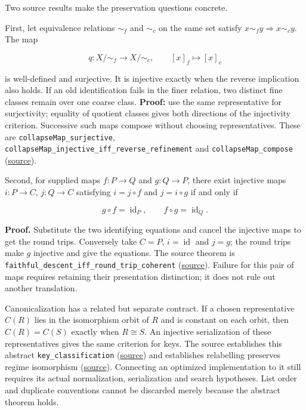 \documentclass[
  11pt,
]{article}
\begin{document}
Two source results make the preservation questions concrete.

First, let equivalence relations \(\sim_f\) and \(\sim_c\) on the same
set satisfy \(x\sim_f y\Rightarrow x\sim_c y\). The map

\[
q:X/{\sim_f}\longrightarrow X/{\sim_c},\qquad [x]_f\longmapsto[x]_c
\]

is well-defined and surjective. It is injective exactly when the reverse
implication also holds. If an old identification fails in the finer
relation, two distinct fine classes remain over one coarse class.
\textbf{Proof:} use the same representative for surjectivity; equality
of quotient classes gives both directions of the injectivity criterion.
Successive such maps compose without choosing representatives. These are
\nolinkurl{collapseMap_surjective},
\nolinkurl{collapseMap_injective_iff_reverse_refinement} and
\nolinkurl{collapseMap_compose}
(\href{lean4/Derivation/QuotientRetention.lean\#L59}{source}).

Second, for supplied maps \(f:P\to Q\) and \(g:Q\to P\), there exist
injective maps \(i:P\to C\), \(j:Q\to C\) satisfying \(i=j\circ f\) and
\(j=i\circ g\) if and only if

\[
g\circ f=\operatorname{id}_P,\qquad f\circ g=\operatorname{id}_Q.
\]

\textbf{Proof.} Substitute the two identifying equations and cancel the
injective maps to get the round trips. Conversely take \(C=P\),
\(i=\operatorname{id}\) and \(j=g\); the round trips make \(g\)
injective and give the equations. The source theorem is
\nolinkurl{faithful_descent_iff_round_trip_coherent}
(\href{lean4/Derivation/PresentationDescent.lean\#L129}{source}).
Failure for this pair of maps requires retaining their presentation
distinction; it does not rule out another translation.

Canonicalization has a related but separate contract. If a chosen
representative \(C(R)\) lies in the isomorphism orbit of \(R\) and is
constant on each orbit, then \(C(R)=C(S)\) exactly when \(R\cong S\). An
injective serialization of these representatives gives the same
criterion for keys. The source establishes this abstract
\nolinkurl{key_classification}
(\href{lean4/CanonicalMinimizer.lean\#L100}{source}) and establishes
relabelling preserves regime isomorphism
(\href{lean4/Derivation/IsoCanon.lean\#L8}{source}). Connecting an
optimized implementation to it still requires its actual normalization,
serialization and search hypotheses. List order and duplicate
conventions cannot be discarded merely because the abstract theorem
holds.
\end{document}
